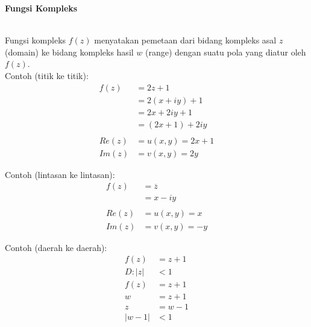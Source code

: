 \documentclass{article}
\begin{document}
    \newpage
    \begin{center}
        \textbf{Fungsi Kompleks}
    \end{center}
    \leavevmode\\

    Fungsi kompleks $f(z)$ menyatakan pemetaan dari bidang kompleks asal $z$ (domain) ke bidang kompleks hasil $w$ (range) dengan suatu pola yang diatur oleh $f(z)$.
    \\

    Contoh (titik ke titik):
    \begin{align}
        f(z)    &= 2z + 1
                \nonumber\\
                &= 2(x+iy) + 1
                \nonumber\\
                &= 2x + 2iy + 1
                \nonumber\\
                &= (2x + 1) + 2iy
                \\\nonumber\\
        Re(z)   &= u(x,y) = 2x + 1
                \nonumber\\
        Im(z)   &= v(x,y) = 2y
                \nonumber
    \end{align}
    
    Contoh (lintasan ke lintasan):
    \begin{align}
        f(z)    &= \overline{z}
                \nonumber\\
                &= x - iy
                \\\nonumber\\
        Re(z)   &= u(x,y) = x
                \nonumber\\
        Im(z)   &= v(x,y) = -y
                \nonumber
    \end{align}

    Contoh (daerah ke daerah):
    \begin{align}
        f(z)    &= z + 1
                \nonumber\\
        D : |z| &<1
                \nonumber\\
        f(z)    &= z + 1
                \nonumber\\
        w       &= z + 1
                \nonumber\\
        z       &= w - 1
                \nonumber\\
        |w-1|   &< 1
                \\\nonumber
    \end{align}
    \\
\end{document}
